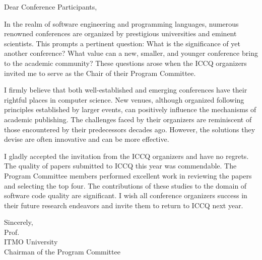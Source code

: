 
\cleardoublepage
{}

Dear Conference Participants,

In the realm of software engineering and programming languages, numerous
renowned conferences are organized by prestigious universities and eminent
scientists. This prompts a pertinent question: What is the significance of yet
another conference? What value can a new, smaller, and younger conference bring
to the academic community? These questions arose when the ICCQ organizers
invited me to serve as the Chair of their Program Committee.

I firmly believe that both well-established and emerging conferences have their
rightful places in computer science. New venues, although organized following
principles established by larger events, can positively influence the
mechanisms of academic publishing. The challenges faced by their organizers are
reminiscent of those encountered by their predecessors decades ago. However,
the solutions they devise are often innovative and can be more effective.

I gladly accepted the invitation from the ICCQ organizers and have no regrets.
The quality of papers submitted to ICCQ this year was commendable. The Program
Committee members performed excellent work in reviewing the papers and
selecting the top four. The contributions of these studies to the domain of
software code quality are significant. I wish all conference organizers success
in their future research endeavors and invite them to return to ICCQ next
year.

\vspace{18pt}
Sincerely,\\
Prof. \\
ITMO University \\
Chairman of the Program Committee \\
